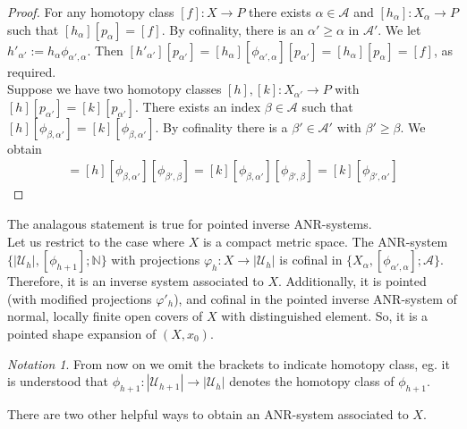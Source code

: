 \documentclass[a4paper,11pt]{article}
\theoremstyle{definition}
\theoremstyle{plain}
\theoremstyle{remark}
\newtheorem*{notation}{Notation}
\begin{document}
{\begin{proof} For any homotopy class $[f]: X\rightarrow P$ there exists $\alpha \in \mathcal{A}$ and $[h_{\alpha}]: X_{\alpha}\rightarrow P$ such that $[h_{\alpha}][p_{\alpha}] = [f]$. By cofinality, there is an $\alpha'\geq \alpha$ in $\mathcal{A}'$. We let $h'_{\alpha'}:=h_{\alpha}\phi_{\alpha',\alpha}$. Then $[h'_{\alpha'}][p_{\alpha'}] =[h_{\alpha}][\phi_{\alpha',\alpha}][p_{\alpha'}]= [h_{\alpha}][p_{\alpha}] = [f]$, as required. \\

Suppose we have two homotopy classes $[h],[k]: X_{\alpha'} \rightarrow P$ with $[h][p_{\alpha'}]= [k][p_{\alpha'}]$. There exists an index $\beta \in \mathcal{A}$ such that $[h][\phi_{\beta,\alpha'}] = [k] [\phi_{\beta,\alpha'}]$. By cofinality there is a $\beta'\in \mathcal{A}'$ with $\beta'\geq \beta$. We obtain 
\begin{align*}
[h][\phi_{\beta',\alpha'}] = [h][\phi_{\beta,\alpha'}][\phi_{\beta',\beta}] = [k] [\phi_{\beta,\alpha'}][\phi_{\beta',\beta}] = [k][\phi_{\beta',\alpha'}]
\end{align*}
\end{proof}

The analagous statement is true for pointed inverse ANR-systems.\\

Let us restrict to the case where $X$ is a compact metric space. The ANR-system $\{|\mathcal{U}_{h}|,[\phi_{h+1}];\mathbb{N}\}$ with projections $\varphi_{h}: X\rightarrow |\mathcal{U}_{h}|$ is cofinal in $\{X_{\alpha},[\phi_{\alpha',\alpha}];\mathcal{A}\}$. Therefore, it is an inverse system associated to $X$. Additionally, it is pointed (with modified projections $\varphi'_{h}$), and cofinal in the pointed inverse ANR-system of normal, locally finite open covers of $X$ with distinguished element. So, it is a pointed shape expansion of $(X,x_0)$.

\begin{notation} From now on we omit the brackets to indicate homotopy class, eg. it is understood that $\phi_{h+1}: |\mathcal{U}_{h+1}|\rightarrow |\mathcal{U}_{h}|$ denotes the homotopy class of $\phi_{h+1}$. 
\end{notation}

There are two other helpful ways to obtain an ANR-system associated to $X$. 

}
\end{document}
